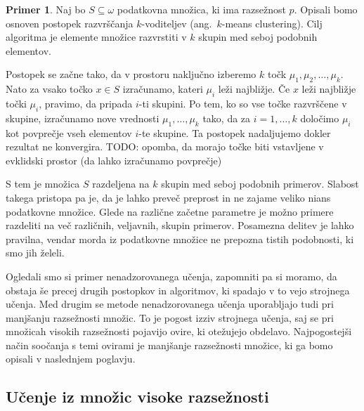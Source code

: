 \documentclass[12pt,a4paper,twoside]{article}
\theoremstyle{definition} %
\newtheorem{primer}[definicija]{Primer}
\theoremstyle{plain} %
\numberwithin{equation}{section}  %
\begin{document}
\begin{primer}
Naj bo $S \subseteq \omega$ podatkovna množica, ki ima razsežnost $p$. 
Opisali bomo osnoven postopek razvrščanja $k$-voditeljev (ang.~$k$-means clustering). 
Cilj algoritma je elemente množice razvrstiti v $k$ skupin med seboj podobnih elementov.


Postopek se začne tako, da v prostoru naključno izberemo $k$ točk $\mu_1, \mu_2, \ldots , \mu_k$. 
Nato za vsako točko $x \in S$ izračunamo, kateri $\mu_i$ leži najbližje. Če $x$ leži najbližje točki $\mu_i$, pravimo, da pripada $i$-ti skupini. 
Po tem, ko so vse točke razvrščene v skupine, izračunamo nove vrednosti $\mu_1, \ldots , \mu_k$ tako, da za $i=1,\ldots,k$ določimo $\mu_i$ kot povprečje vseh elementov $i$-te skupine. 
Ta postopek nadaljujemo dokler rezultat ne konvergira. TODO: opomba, da morajo točke biti vstavljene v evklidski prostor (da lahko izračunamo povprečje)

S tem je množica $S$ razdeljena na $k$ skupin med seboj podobnih primerov. 
Slabost takega pristopa pa je, da je lahko preveč preprost in ne zajame veliko nians podatkovne množice. 
Glede na različne začetne parametre je možno primere razdeliti na več različnih, veljavnih, skupin primerov. 
Posamezna delitev je lahko pravilna, vendar morda iz podatkovne množice ne prepozna tistih podobnosti, ki smo jih želeli.
\end{primer}


Ogledali smo si primer nenadzorovanega učenja, zapomniti pa si moramo, da obstaja še precej drugih postopkov in algoritmov, ki spadajo v to vejo strojnega učenja. 
Med drugim se metode nenadzorovanega učenja uporabljajo tudi pri manjšanju razsežnosti množic. 
To je pogost izziv strojnega učenja, saj se pri množicah visokih razsežnosti pojavijo ovire, ki otežujejo obdelavo. 
Najpogostejši način soočanja s temi ovirami je manjšanje razsežnosti množice, ki ga bomo opisali v naslednjem poglavju.



\subsection{Učenje iz množic visoke razsežnosti}
\end{document}
